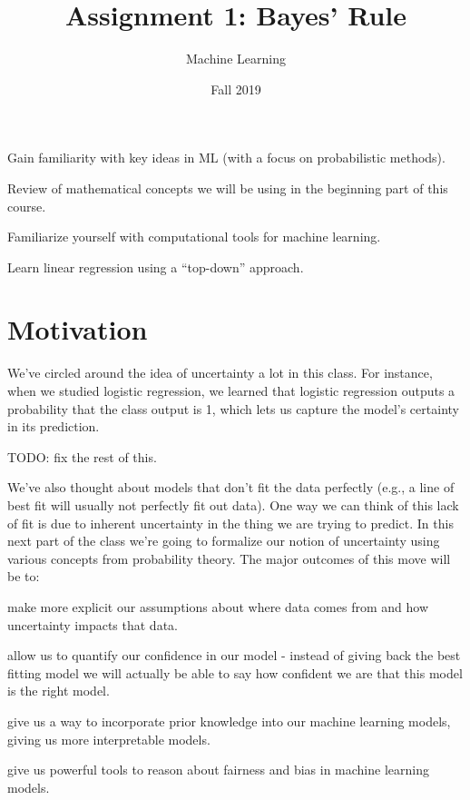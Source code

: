 \documentclass[assignment01_Solutions]{subfiles}
\title{Assignment 1: Bayes' Rule}
\author{Machine Learning}
\date{Fall 2019}
\begin{document}
\maketitle
\thispagestyle{firstpage}


\begin{learningobjectives}
\bi
\item Gain familiarity with key ideas in ML (with a focus on probabilistic methods).
\item Review of mathematical concepts we will be using in the beginning part of this course.
\item Familiarize yourself with computational tools for machine learning.
\item Learn linear regression using a ``top-down'' approach.
\ei
\end{learningobjectives}

\section{Motivation}
We’ve circled around the idea of uncertainty a lot in this class.  For instance, when we studied logistic regression, we learned that logistic regression outputs a probability that the class output is 1, which lets us capture the model's certainty in its prediction.

TODO: fix the rest of this.

We’ve also thought about models that don’t fit the data perfectly (e.g., a line of best fit will usually not perfectly fit out data).  One way we can think of this lack of fit is due to inherent uncertainty in the thing we are trying to predict.
In this next part of the class we’re going to formalize our notion of uncertainty using various concepts from probability theory.  The major outcomes of this move will be to:

\bi
\item make more explicit our assumptions about where data comes from and how uncertainty impacts that data.
\item allow us to quantify our confidence in our model - instead of giving back the best fitting model we will actually be able to say how confident we are that this model is the right model.
\item give us a way to incorporate prior knowledge into our machine learning models, giving us more interpretable models.
\item give us powerful tools to reason about fairness and bias in machine learning models.
\ei
\end{document}
